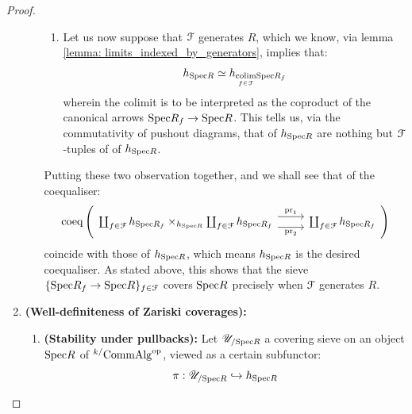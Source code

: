 \begin{proof}
\begin{enumerate}
\begin{enumerate}
\begin{enumerate}
                                                \item Let us now suppose that $\mathcal{F}$ generates $R$, which we know, via lemma \ref{lemma: limits_indexed_by_generators}, implies that:
                                                    $$h_{\mathrm{Spec} R} \simeq h_{\underset{f \in \mathcal{F}}{\operatorname{colim}} \mathrm{Spec} R_f}$$
                                                wherein the colimit is to be interpreted as the coproduct of the canonical arrows $\mathrm{Spec} R_f \to \mathrm{Spec} R$. This tells us, via the commutativity of pushout diagrams, that  of $h_{\mathrm{Spec} R}$ are nothing but $\mathcal{F}$-tuples of  of $h_{\mathrm{Spec} R}$.
                                            \end{enumerate}
                                         Putting these two observation together, and we shall see that  of the coequaliser:
                                            $$
                                                \coeq
                                                \left(
                                                    \begin{tikzcd}
                                                    	{\coprod_{f \in \calF} h_{\Spec R_f} \x_{h_{\Spec R}} \coprod_{f \in \calF} h_{\Spec R_f}} & {\coprod_{f \in \calF} h_{\Spec R_f}}
                                                    	\arrow["{\pr_2}"', shift right=2, from=1-1, to=1-2]
                                                    	\arrow["{\pr_1}", shift left=2, from=1-1, to=1-2]
                                                    \end{tikzcd}
                                                \right)
                                            $$
                                        coincide with those of $h_{\mathrm{Spec} R}$, which means $h_{\mathrm{Spec} R}$ is the desired coequaliser. As stated above, this shows that the sieve $\{\mathrm{Spec} R_f \to \mathrm{Spec} R\}_{f \in \mathcal{F}}$ covers $\mathrm{Spec} R$ precisely when $\mathcal{F}$ generates $R$. 
                                    \end{enumerate}
                                \item \textbf{(Well-definiteness of Zariski coverages):} 
                                    \begin{enumerate}
                                        \item \textbf{(Stability under pullbacks):} Let $\mathscr{U}_{/\mathrm{Spec} R}$ a covering sieve on an object $\mathrm{Spec} R$ of ${}^{k/}\mathrm{Comm}\mathrm{Alg}^{\mathrm{op}}$, viewed as a certain subfunctor:
                                            $$\pi: \mathscr{U}_{/\mathrm{Spec} R} \hookrightarrow h_{\mathrm{Spec} R}$$

\end{enumerate}
\end{enumerate}
\end{proof}
